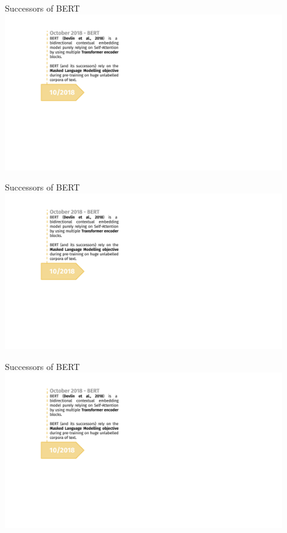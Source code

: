 \begin{frame}{Successors of BERT}
\hbox{\hspace{-3em} \includegraphics[width=12cm,page=1]{figure/transfer_learning_timeline4_nlp.pdf}}
\end{frame}
\begin{frame}[noframenumbering]{Successors of BERT}
\hbox{\hspace{-3em} \includegraphics[width=12cm,page=2]{figure/transfer_learning_timeline4_nlp.pdf}}
\end{frame}
\begin{frame}[noframenumbering]{Successors of BERT}
\hbox{\hspace{-3em} \includegraphics[width=12cm,page=3]{figure/transfer_learning_timeline4_nlp.pdf}}
\end{frame}
